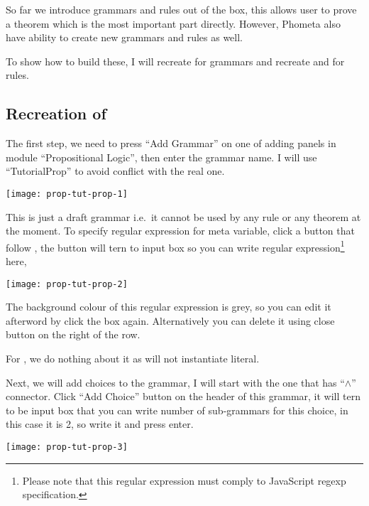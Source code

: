 \documentclass[master.tex]{subfiles}
\begin{document}
So far we introduce grammars and rules out of the box, this allows user to prove
a theorem which is the most important part directly. However, Phometa also have
ability to create new grammars and rules as well.

To show how to build these, I will recreate  for grammars and
recreate  and  for rules.

\subsection{Recreation of }

The first step, we need to press ``Add Grammar'' on one of adding panels in
module ``Propositional Logic'', then enter the grammar name. I will use
``TutorialProp'' to avoid conflict with the real one.

\begin{center}
  \texttt{[image: prop-tut-prop-1]}
\end{center}

This is just a draft grammar i.e.\ it cannot be used by any rule or any theorem
at the moment. To specify regular expression for meta variable, click a button
that follow \kMetaVarRegex, the button will tern to input box so you can write
regular expression\footnote{Please note that this regular expression must comply to
JavaScript regexp specification.} here,

\begin{center}
  \texttt{[image: prop-tut-prop-2]}
\end{center}

The background colour of this regular expression is grey, so you can edit it
afterword by click the box again. Alternatively you can delete it using close
button on the right of the row.

For \kLiteralRegex, we do nothing about it as  will not
instantiate literal.

Next, we will add choices to the grammar, I will start with the one that has
``$\wedge$'' connector. Click ``Add Choice'' button on the header of this
grammar, it will tern to be input box that you can write number of sub-grammars
for this choice, in this case it is 2, so write it and press enter.

\begin{center}
  \texttt{[image: prop-tut-prop-3]}
\end{center}
\end{document}
